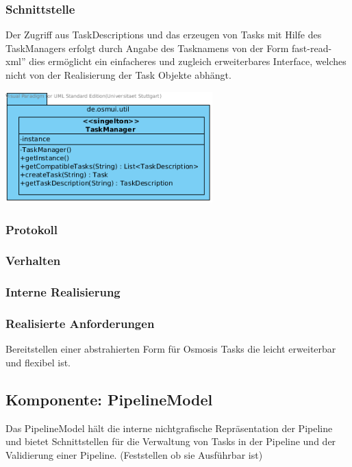 \documentclass[a4paper,12pt]{scrartcl}
\begin{document}
\subsubsection{Schnittstelle}
Der Zugriff aus TaskDescriptions und das erzeugen von Tasks mit Hilfe des TaskManagers erfolgt durch Angabe des Tasknamens
von der Form \glqq fast-read-xml'' dies ermöglicht ein einfacheres und zugleich erweiterbares Interface, welches nicht von der Realisierung der Task Objekte abhängt.
\begin{center}
\includegraphics[width=8cm]{Schnittstelle_TaskManager.png}
\end{center}
\subsubsection{Protokoll}
\subsubsection{Verhalten}
\subsubsection{Interne Realisierung}
\subsubsection{Realisierte Anforderungen}
Bereitstellen einer abstrahierten Form für Osmosis Tasks die leicht erweiterbar und flexibel ist.

\newpage
\subsection{Komponente: PipelineModel}
Das PipelineModel hält die interne nichtgrafische Repräsentation der Pipeline und bietet Schnittstellen für die Verwaltung von Tasks in der Pipeline und der Validierung einer Pipeline. (Feststellen ob sie Ausführbar ist)
\end{document}
